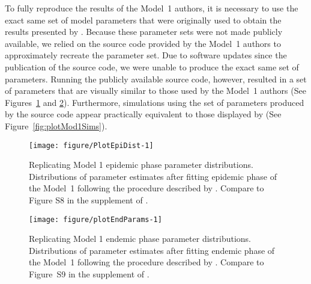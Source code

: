 To fully reproduce the results of the Model~1 authors, it is necessary to use the exact same set of model parameters that were originally used to obtain the results presented by \citet{lee20}.
Because these parameter sets were not made publicly available, we relied on the source code provided by the Model~1 authors to approximately recreate the parameter set.
Due to software updates since the publication of the source code, we were unable to produce the exact same set of parameters.
Running the publicly available source code, however, resulted in a set of parameters that are visually similar to those used by the Model~1 authors (See Figures~\ref{fig:PlotEpiDist} and \ref{fig:plotEndParams}).
Furthermore, simulations using the set of parameters produced by the source code appear practically equivalent to those displayed by \citet{lee20} (See Figure~\ref{fig:plotMod1Sims}).



\begin{figure}[!h]
\begin{knitrout}
\color{fgcolor}

{\centering \texttt{[image: figure/PlotEpiDist-1]} 

}


\end{knitrout}
\caption[Replicating Model 1 epidemic phase parameter distributions.]{\label{fig:PlotEpiDist}
Replicating Model 1 epidemic phase parameter distributions. Distributions of parameter estimates after fitting epidemic phase of the Model~1 following the procedure described by \citet{lee20}. Compare to Figure S8 in the supplement of \citet{lee20}.
}
\end{figure}





\begin{figure}[!h]
\begin{knitrout}
\color{fgcolor}

{\centering \texttt{[image: figure/plotEndParams-1]} 

}


\end{knitrout}
\caption[Replicating Model 1 endemic phase parameter distributions.]{\label{fig:plotEndParams}
Replicating Model 1 endemic phase parameter distributions. Distributions of parameter estimates after fitting endemic phase of the Model~1 following the procedure described by \citet{lee20}. Compare to Figure~S9 in the supplement of \citet{lee20}.
}
\end{figure}



